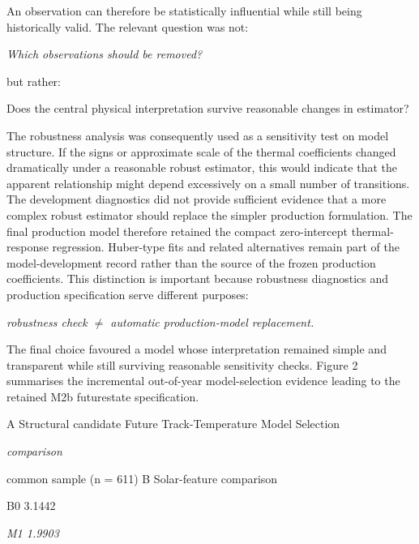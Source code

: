 An observation can therefore be statistically influential while still being historically valid. The relevant question was not:

\begin{center}\textit{Which observations should be removed?}\end{center}

but rather:

Does the central physical interpretation survive reasonable changes in estimator?

The robustness analysis was consequently used as a sensitivity test on model structure. If the signs or approximate scale of the thermal coefficients changed dramatically under a reasonable robust estimator, this would indicate that the apparent relationship might depend excessively on a small number of transitions. The development diagnostics did not provide sufficient evidence that a more complex robust estimator should replace the simpler production formulation. The final production model therefore retained the compact zero-intercept thermal-response regression. Huber-type fits and related alternatives remain part of the model-development record rather than the source of the frozen production coefficients. This distinction is important because robustness diagnostics and production specification serve different purposes:

\begin{center}\textit{robustness check \ensuremath{\neq} automatic production-model replacement.}\end{center}

The final choice favoured a model whose interpretation remained simple and transparent while still surviving reasonable sensitivity checks. Figure 2 summarises the incremental out-of-year model-selection evidence leading to the retained M2b futurestate specification.

A Structural candidate Future Track-Temperature Model Selection

\begin{center}\textit{comparison}\end{center}

common sample (n = 611) B Solar-feature comparison

B0 3.1442

\begin{center}\textit{M1                                                                     1.9903}\end{center}


